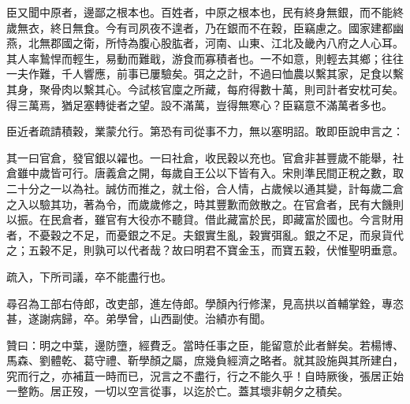 \begin{pinyinscope}
臣又聞中原者，邊鄙之根本也。百姓者，中原之根本也，民有終身無銀，而不能終歲無衣，終日無食。今有司夙夜不遑者，乃在銀而不在穀，臣竊慮之。國家建都幽燕，北無郡國之衛，所恃為腹心股肱者，河南、山東、江北及畿內八府之人心耳。其人率鷙悍而輕生，易動而難戢，游食而寡積者也。一不如意，則輕去其鄉；往往一夫作難，千人響應，前事已屢驗矣。弭之之計，不過曰恤農以繫其家，足食以繫其身，聚骨肉以繫其心。今試核官廩之所藏，每府得數十萬，則司計者安枕可矣。得三萬焉，猶足塞轉徙者之望。設不滿萬，豈得無寒心？臣竊意不滿萬者多也。

臣近者疏請積穀，業蒙允行。第恐有司從事不力，無以塞明詔。敢即臣說申言之：

其一曰官倉，發官銀以糴也。一曰社倉，收民穀以充也。官倉非甚豐歲不能舉，社倉雖中歲皆可行。唐義倉之開，每歲自王公以下皆有入。宋則準民間正稅之數，取二十分之一以為社。誠仿而推之，就土俗，合人情，占歲候以通其變，計每歲二倉之入以驗其功，著為令，而歲歲修之，時其豐歉而斂散之。在官倉者，民有大饑則以振。在民倉者，雖官有大役亦不聽貸。借此藏富於民，即藏富於國也。今言財用者，不憂穀之不足，而憂銀之不足。夫銀實生亂，穀實弭亂。銀之不足，而泉貨代之；五穀不足，則孰可以代者哉？故曰明君不寶金玉，而寶五穀，伏惟聖明垂意。

疏入，下所司議，卒不能盡行也。

尋召為工部右侍郎，改吏部，進左侍郎。學顏內行修潔，見高拱以首輔掌銓，專恣甚，遂謝病歸，卒。弟學曾，山西副使。治績亦有聞。

贊曰：明之中葉，邊防墮，經費乏。當時任事之臣，能留意於此者鮮矣。若楊博、馬森、劉體乾、葛守禮、靳學顏之屬，庶幾負經濟之略者。就其設施與其所建白，究而行之，亦補苴一時而已，況言之不盡行，行之不能久乎！自時厥後，張居正始一整飭。居正歿，一切以空言從事，以迄於亡。蓋其壞非朝夕之積矣。


\end{pinyinscope}